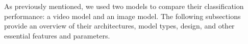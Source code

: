 As previously mentioned, we used two models to compare their classification performance: a video model and an image model. The following subsections provide an overview of their architectures, model types, design, and other essential features and parameters.



